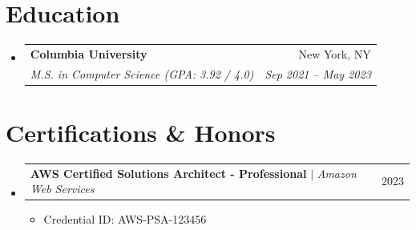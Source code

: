 \documentclass[letterpaper,11pt]{article}
\makeatletter
\newcommand{\resumeItem}[1]{
  \item\small{
    {#1 \vspace{-2pt}}
  }
}
\newcommand{\resumeSubheading}[4]{
  \vspace{-2pt}\item
    \begin{tabular*}{0.97\textwidth}[t]{l@{\extracolsep{\fill}}r}
      \textbf{#1} & #2 \\
      \textit{\small#3} & \textit{\small #4} \\
    \end{tabular*}\vspace{-7pt}
}
\newcommand{\resumeProjectHeading}[2]{
    \vspace{-2pt}\item
    \begin{tabular*}{0.97\textwidth}{l@{\extracolsep{\fill}}r}
      \small#1 & #2 \\
    \end{tabular*}\vspace{-7pt}
}
\newcommand{\resumeSubHeadingListStart}{\begin{itemize}[leftmargin=0.15in, label={}]}
\newcommand{\resumeSubHeadingListEnd}{\end{itemize}}
\newcommand{\resumeItemListStart}{\begin{itemize}}
\newcommand{\resumeItemListEnd}{\end{itemize}\vspace{-2pt}}
\makeatother
\begin{document}
\section{Education}
  \resumeSubHeadingListStart
    \resumeSubheading
      {Columbia University}{New York, NY}
      {M.S. in Computer Science (GPA: 3.92 / 4.0)}{Sep 2021 -- May 2023}
  \resumeSubHeadingListEnd

\section{Certifications \& Honors}
  \resumeSubHeadingListStart
    \resumeProjectHeading
      {\textbf{AWS Certified Solutions Architect - Professional} $|$ \emph{Amazon Web Services}}{2023}
      \resumeItemListStart
        \resumeItem{Credential ID: AWS-PSA-123456}
      \resumeItemListEnd
  \resumeSubHeadingListEnd
\end{document}
